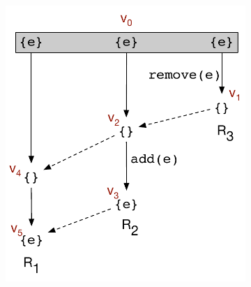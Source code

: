 \begin{figure}[ht]
  \centering
  \begin{subfigure}[t]{0.55\columnwidth}
    \includegraphics[scale=0.35]{Figures/mrdt-execs-1}
    \caption{}
    \label{fig:mrdt-execs-1}
  \end{subfigure}
  \begin{subfigure}[t]{0.44\columnwidth}

\end{subfigure}
\end{figure}
